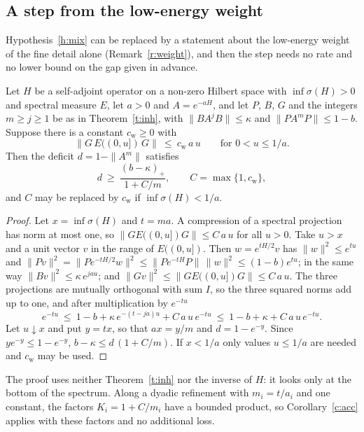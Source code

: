 \subsection*{A step from the low-energy weight}
Hypothesis~\ref{h:mix} can be replaced by a statement about the low-energy weight of the fine detail alone
(Remark~\ref{r:weight}), and then the step needs no rate and no lower bound on the gap given in advance.

\begin{proposition}\label{p:wstep}
Let $H$ be a self-adjoint operator on a non-zero Hilbert space with $\inf\sigma(H)>0$ and spectral measure
$E$, let $a>0$ and $A=e^{-aH}$, and let $P$, $B$, $G$ and the integers $m\ge j\ge1$ be as in
Theorem~\ref{t:inh}, with $\|BA^jB\|\le\kappa$ and $\|PA^mP\|\le1-b$. Suppose there is a constant
$c_{\mathrm w}\ge0$ with
\begin{equation}\label{e:wlin}
\big\|G\,E((0,u])\,G\big\|\ \le\ c_{\mathrm w}\,a\,u\qquad\text{for }0<u\le1/a .
\end{equation}
Then the deficit $d=1-\|A^m\|$ satisfies
\[
d\ \ge\ \frac{(b-\kappa)_+}{1+C/m},\qquad C=\max\{1,c_{\mathrm w}\},
\]
and $C$ may be replaced by $c_{\mathrm w}$ if $\inf\sigma(H)<1/a$.
\end{proposition}
\begin{proof}
Let $x=\inf\sigma(H)$ and $t=ma$. A compression of a spectral projection has norm at most one, so
$\|GE((0,u])G\|\le C\,a\,u$ for all $u>0$. Take $u>x$ and a unit vector $v$ in the range of $E((0,u])$. Then
$w=e^{tH/2}v$ has $\|w\|^2\le e^{tu}$ and
$\|Pv\|^2=\|Pe^{-tH/2}w\|^2\le\|Pe^{-tH}P\|\,\|w\|^2\le(1-b)e^{tu}$; in the same way
$\|Bv\|^2\le\kappa\,e^{jau}$; and $\|Gv\|^2\le\|GE((0,u])G\|\le C\,a\,u$. The three projections are mutually
orthogonal with sum $I$, so the three squared norms add up to one, and after multiplication by $e^{-tu}$
\[
e^{-tu}\ \le\ 1-b+\kappa\,e^{-(t-ja)u}+C\,a\,u\,e^{-tu}\ \le\ 1-b+\kappa+C\,a\,u\,e^{-tu}.
\]
Let $u\downarrow x$ and put $y=tx$, so that $ax=y/m$ and $d=1-e^{-y}$. Since $ye^{-y}\le1-e^{-y}$,
$b-\kappa\le d\,(1+C/m)$. If $x<1/a$ only values $u\le1/a$ are needed and $c_{\mathrm w}$ may be used.
\end{proof}

The proof uses neither Theorem~\ref{t:inh} nor the inverse of $H$: it looks only at the bottom of the
spectrum. Along a dyadic refinement with $m_i=t/a_i$ and one constant, the factors $K_i=1+C/m_i$ have a
bounded product, so Corollary~\ref{c:acc} applies with these factors and no additional loss.

